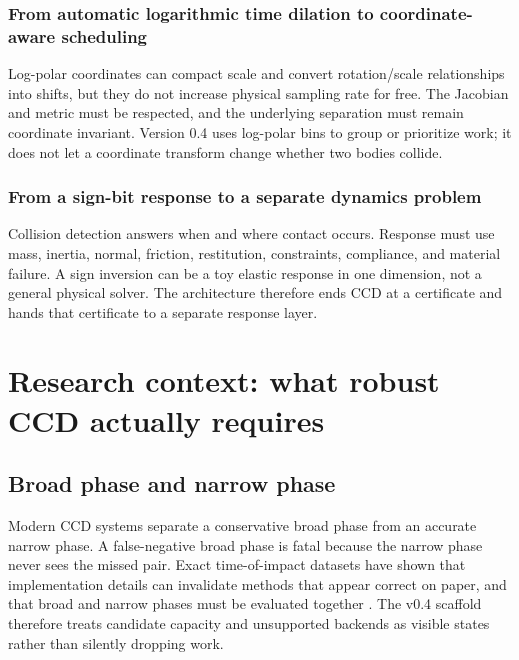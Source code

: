 \documentclass[11pt,a4paper,openany]{book}
\begin{document}
\subsection{From automatic logarithmic time dilation to coordinate-aware scheduling}
Log-polar coordinates can compact scale and convert rotation/scale relationships into shifts, but they do not increase physical sampling rate for free. The Jacobian and metric must be respected, and the underlying separation must remain coordinate invariant. Version 0.4 uses log-polar bins to group or prioritize work; it does not let a coordinate transform change whether two bodies collide.

\subsection{From a sign-bit response to a separate dynamics problem}
Collision detection answers when and where contact occurs. Response must use mass, inertia, normal, friction, restitution, constraints, compliance, and material failure. A sign inversion can be a toy elastic response in one dimension, not a general physical solver. The architecture therefore ends CCD at a certificate and hands that certificate to a separate response layer.



\chapter{Research context: what robust CCD actually requires}
\section{Broad phase and narrow phase}
Modern CCD systems separate a conservative broad phase from an accurate narrow phase. A false-negative broad phase is fatal because the narrow phase never sees the missed pair. Exact time-of-impact datasets have shown that implementation details can invalidate methods that appear correct on paper, and that broad and narrow phases must be evaluated together \citep{belgrod2023toi}. The v0.4 scaffold therefore treats candidate capacity and unsupported backends as visible states rather than silently dropping work.
\end{document}
